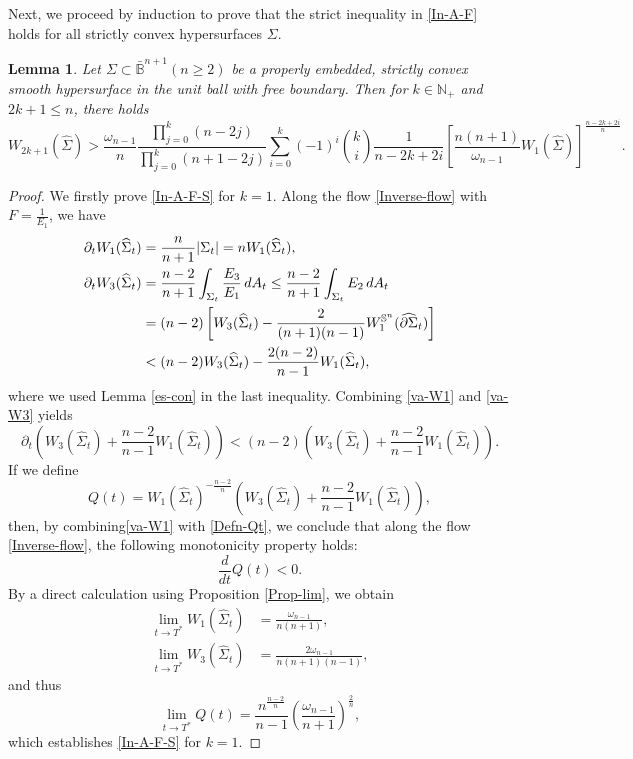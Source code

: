\documentclass[11pt,reqno]{amsart}
\newtheorem{lem}[thm]{Lemma}
\theoremstyle{definition}
\theoremstyle{remark}
\numberwithin{equation}{section}
\renewcommand{\(}{\left(}
\renewcommand{\)}{\right)}
\renewcommand{\-}{\overline}
\begin{document}
Next, we proceed by induction to prove that the strict inequality in \eqref{In-A-F} holds for all strictly convex hypersurfaces $\Sigma$. 
\begin{lem}\label{Lem-Strictly}
	Let $\Sigma\subset\bar{\mathbb{B}}^{n+1} (n\geq 2)$ be a properly embedded, strictly convex smooth hypersurface in the unit ball with free boundary. Then for $k\in\mathbb{N}_{+}$ and $2k+1\leq n$, there holds
	\begin{equation}\label{In-A-F-S}
		W_{2k+1}(\widehat{\Sigma})>\frac{\omega_{n-1}}{n}\frac{\prod_{j=0}^k(n-2j)}{\prod_{j=0}^k(n+1-2j)}\sum_{i=0}^k(-1)^i\binom{k}{i}\frac{1}{n-2k+2i}\left[\frac{n(n+1)}{\omega_{n-1}}W_1(\widehat{\Sigma})\right]^{\frac{n-2k+2i}{n}}.
	\end{equation}
\end{lem}
\begin{proof}
	We firstly prove \eqref{In-A-F-S} for $k=1$. Along the flow \eqref{Inverse-flow} with $F=\frac{1}{E_1}$, we have
	\begin{align}
		\partial_t W_1(\widehat{\Sigma}_t)&=\frac{n}{n+1}|\Sigma_t|=n W_1(\widehat{\Sigma}_t),\label{va-W1}\\
		\partial_t W_3(\widehat{\Sigma}_t)&=\frac{n-2}{n+1}\int_{\Sigma_t}{\frac{E_3}{E_1}}\,dA_t\notag\leq \frac{n-2}{n+1}\int_{\Sigma_t}{E_2}\,dA_t\notag\\
		&=(n-2)\left[W_3(\widehat{\Sigma}_t)-\frac{2}{(n+1)(n-1)}W_1^{\mathbb{S}^n}(\widehat{\partial\Sigma}_t)\right]\notag\\
		&<(n-2)W_3(\widehat{\Sigma}_t)-\frac{2(n-2)}{n-1}W_1(\widehat{\Sigma}_t),\label{va-W3}
	\end{align}
where we used Lemma \ref{es-con} in the last inequality. Combining \eqref{va-W1} and \eqref{va-W3} yields
\begin{equation*}
	\partial_t\left(W_3(\widehat{\Sigma}_t)+\frac{n-2}{n-1}W_1(\widehat{\Sigma}_t)\right)<(n-2)\left(W_3(\widehat{\Sigma}_t)+\frac{n-2}{n-1}W_1(\widehat{\Sigma}_t)\right).
\end{equation*}
If we define
\begin{equation}\label{Defn-Qt}
	Q(t)=W_1(\widehat{\Sigma}_t)^{-\frac{n-2}{n}}\left(W_3(\widehat{\Sigma}_t)+\frac{n-2}{n-1}W_1(\widehat{\Sigma}_t)\right),
\end{equation}
then,  by combining\eqref{va-W1} with \eqref{Defn-Qt}, we conclude that along the flow \eqref{Inverse-flow}, the following monotonicity property holds:
\begin{equation}\label{Mono-Q}
	\frac{d}{dt}Q(t)<0.
\end{equation}
By a direct calculation using Proposition \ref{Prop-lim}, we obtain
\begin{align*}
	\lim_{t\to T^{*}}W_{1}(\widehat{\Sigma}_t)&=\frac{\omega_{n-1}}{n(n+1)},\\
	\lim_{t\to T^{*}}W_{3}(\widehat{\Sigma}_t)&=\frac{2\omega_{n-1}}{n(n+1)(n-1)},
\end{align*}
and thus
\begin{equation}\label{Lim-Q}
	\lim_{t\to T^{*}} Q(t)=\frac{n^{\frac{n-2}{n}}}{n-1}\left(\frac{\omega_{n-1}}{n+1}\right)^{\frac{2}{n}},
\end{equation}
which establishes \eqref{In-A-F-S} for $k=1$.


\end{proof}
\end{document}
